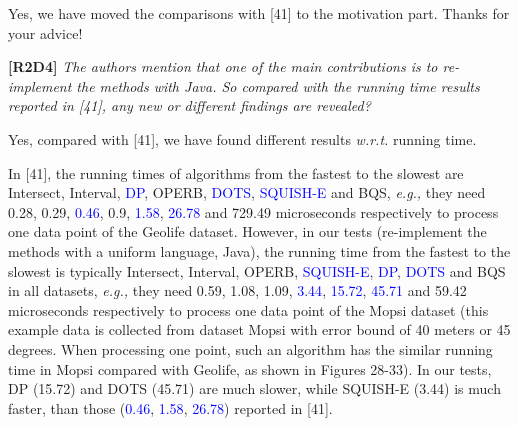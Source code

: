 \documentclass{letter}
\newcommand{\eg}{\emph{e.g.,}\xspace}
\newcommand{\wrt}{\emph{w.r.t.}\xspace}
\begin{document}
Yes, we have moved the comparisons with [41] to the motivation part. Thanks for your advice!
%
%
%
%




\textbf{[R2D4]} \emph{The authors mention that one of the main contributions is to re-implement the methods with Java. So compared with the running time results reported in [41], any new or different findings are revealed?}


Yes, compared with [41], we have found different results \wrt running time.

In [41], the running times of algorithms from the fastest to the slowest are Intersect, Interval, \textcolor{blue}{DP}, OPERB, \textcolor{blue}{DOTS}, \textcolor{blue}{SQUISH-E} and BQS, \eg they need 0.28, 0.29, \textcolor{blue}{0.46}, 0.9, \textcolor{blue}{1.58}, \textcolor{blue}{26.78} and 729.49 microseconds respectively to process one data point of the Geolife dataset.
However, in our tests (re-implement the methods with a uniform language, Java), the running time from the fastest to the slowest is typically Intersect, Interval, OPERB, \textcolor{blue}{SQUISH-E}, \textcolor{blue}{DP},  \textcolor{blue}{DOTS} and BQS in all datasets, \eg they need 0.59, 1.08, 1.09, \textcolor{blue}{3.44}, \textcolor{blue}{15.72}, \textcolor{blue}{45.71} and 59.42 microseconds respectively to process one data point of the Mopsi dataset (this example data is collected from dataset Mopsi with error bound of 40 meters or 45 degrees. When processing one point, such an algorithm has the similar running time in Mopsi compared with Geolife, as shown in Figures 28-33). In our tests, DP (15.72) and DOTS (45.71) are much slower, while SQUISH-E (3.44) is much faster, than those (\textcolor{blue}{0.46}, \textcolor{blue}{1.58}, \textcolor{blue}{26.78}) reported in [41].
\end{document}
